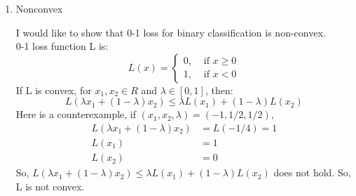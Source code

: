 \documentclass[11pt]{article}
\begin{document}
\begin{enumerate}
\begin{enumerate}
        
        \item Nonconvex
        
        I would like to show that 0-1 loss for binary classification is non-convex.
        \\0-1 loss function L is:
        \[L(x)=\left\{\begin{array}{ll}
0, & \text { if } x \geq 0 \\
1, & \text { if } x<0
\end{array}\right.\]
        If L is convex, for $x_1, x_2\in R$ and $\lambda \in[0,1]$, then:
        \[L\left(\lambda x_{1}+(1-\lambda) x_{2}\right) \leq \lambda L\left(x_{1}\right)+(1-\lambda) L\left(x_{2}\right)\]
        Here is a counterexample, if $\left(x_{1}, x_{2}, \lambda\right)=(-1,1 / 2,1 / 2)$,
        \[\begin{aligned}
L\left(\lambda x_{1}+(1-\lambda) x_{2}\right) &=L(-1 / 4)=1 \\
L\left(x_{1}\right) &=1 \\
L\left(x_{2}\right) &=0
\end{aligned}\]
        So, $L\left(\lambda x_{1}+(1-\lambda) x_{2}\right) \leq \lambda L\left(x_{1}\right)+(1-\lambda) L\left(x_{2}\right)$ does not hold. So, L is not convex.
    \end{enumerate}
    
\end{enumerate}
\end{document}
